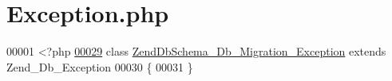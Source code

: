 \hypertarget{Migration_2Exception_8php}{\section{Exception.\-php}
\label{Migration_2Exception_8php}
}

\begin{DoxyCode}
00001 <?php
\hypertarget{Migration_2Exception_8php_source_l00029}{}\hyperlink{classZendDbSchema__Db__Migration__Exception}{00029} \textcolor{keyword}{class }\hyperlink{classZendDbSchema__Db__Migration__Exception}{ZendDbSchema\_Db\_Migration\_Exception} \textcolor{keyword}{
      extends} Zend\_Db\_Exception
00030 \{
00031 \}
\end{DoxyCode}
